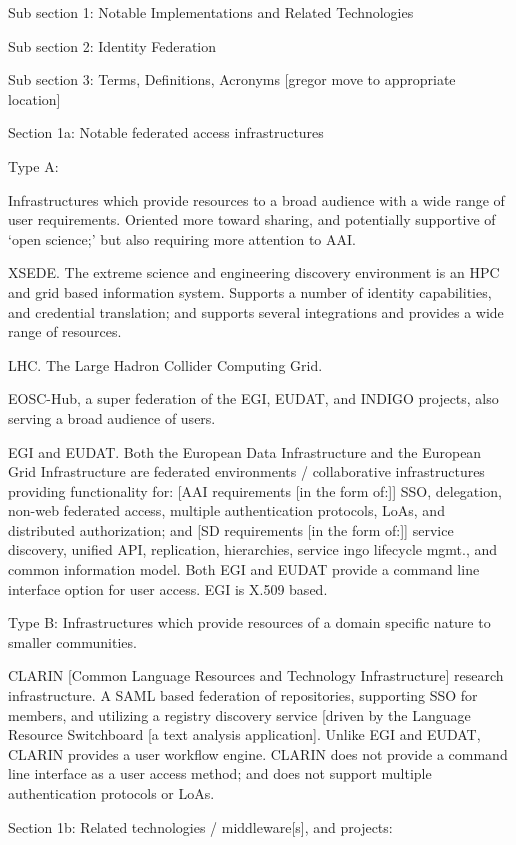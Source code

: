 \documentclass[12pt]{article}
\begin{document}
Sub section 1: 	Notable Implementations and Related Technologies

Sub section 2:	Identity Federation

Sub section 3: 	Terms, Definitions, Acronyms [{gregor} move to appropriate location]

Section 1a: Notable federated access infrastructures 

Type A: 

Infrastructures which provide resources to a broad audience with a wide range of user requirements. Oriented more toward sharing, and potentially supportive of ‘open science;’ but also requiring more attention to AAI. 

XSEDE. The extreme science and engineering discovery environment is an HPC and grid based information system. Supports a number of identity capabilities, and credential translation; and supports several integrations and provides a wide range of resources. 

LHC. The Large Hadron Collider Computing Grid. 

EOSC-Hub, a super federation of the EGI, EUDAT, and INDIGO projects, also serving a broad audience of users. 

EGI and EUDAT. Both the European Data Infrastructure and the European Grid Infrastructure are federated environments / collaborative infrastructures providing functionality for: [AAI requirements [in the form of:]] SSO, delegation, non-web federated access, multiple authentication protocols, LoAs, and distributed authorization; and [SD requirements [in the form of:]] service discovery, unified API, replication, hierarchies, service ingo lifecycle mgmt., and common information model. Both EGI and EUDAT provide a command line interface option for user access. EGI is X.509 based. 

Type B: 
Infrastructures which provide resources of a domain specific nature to smaller communities. 

CLARIN [Common Language Resources and Technology Infrastructure] research infrastructure. A SAML based federation of repositories, supporting SSO for members, and utilizing a registry discovery service [driven by the Language Resource Switchboard [a text analysis application]. Unlike EGI and EUDAT, CLARIN provides a user workflow engine. CLARIN does not provide a command line interface as a user access method; and does not support multiple authentication protocols or LoAs. 

Section 1b: Related technologies / middleware[s], and projects: 
\end{document}
